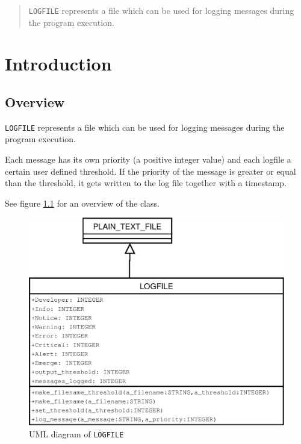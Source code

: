 \documentclass[a4paper,fleqn]{report}
\begin{document}
\begin{abstract}
  \texttt{LOGFILE} represents a file which can be used for logging
  messages during the program execution.
\end{abstract}

\clearpage
\tableofcontents

\clearpage
\listoffigures

\chapter{Introduction}
\label{cha:introduction}


\setcounter{page}{0} 



\section{Overview}
\label{sec:overview}

\texttt{LOGFILE} represents a file which can be used for logging
messages during the program execution.

Each message has its own priority (a positive integer value) and each
logfile a certain user defined threshold. If the priority of the
message is greater or equal than the threshold, it gets written to the
log file together with a timestamp.

See figure \ref{fig:uml-diagram} for an overview of the class.

\begin{figure}[htbp]
  \centering
  \includegraphics[width=\textwidth]{./figures/uml}
  \caption{UML diagram of \texttt{LOGFILE}}
  \label{fig:uml-diagram}
\end{figure}
\end{document}
